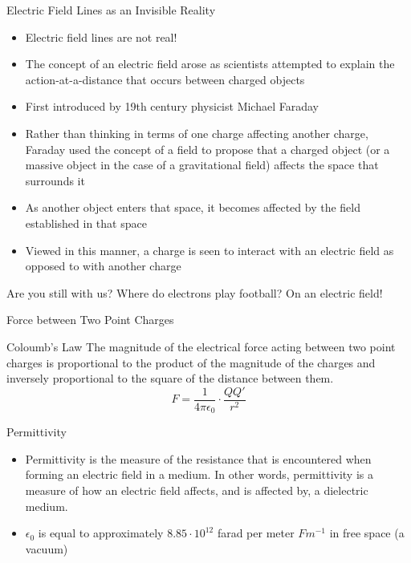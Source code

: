 \documentclass{beamer}
\begin{document}
	
\begin{frame}{Electric Field Lines as an Invisible Reality}{}
  \begin{itemize}
    \item Electric field lines are not real!
	\item The concept of an electric field arose as scientists attempted to explain the action-at-a-distance that occurs between charged objects
	\item First introduced by 19th century physicist Michael Faraday
	\item Rather than thinking in terms of one charge affecting another charge, Faraday used the concept of a field to propose that a charged object (or a massive object in the case of a gravitational field) affects the space that surrounds it
	\item  As another object enters that space, it becomes affected by the field established in that space
	\item Viewed in this manner, a charge is seen to interact with an electric field as opposed to with another charge
  \end{itemize}
\end{frame}

\begin{frame}{Are you still with us?}
Where do electrons play football? On an electric field!
\end{frame}

\begin{frame}{Force between Two Point Charges}
  \begin{block}{Coloumb's Law}
The magnitude of the electrical force acting between two point charges is proportional to the product of the magnitude of the charges and inversely proportional to the square of the distance between them.
\[F=\frac{1}{4\pi \epsilon_0} \cdot \frac{QQ\prime}{r^2} \]
  \end{block}
\end{frame}

\begin{frame}{Permittivity}{}
  \begin{itemize}
  \item Permittivity is the measure of the resistance that is encountered when forming an electric field in a medium. In other words, permittivity is a measure of how an electric field affects, and is affected by, a dielectric medium.
  \item \(\epsilon_0\) is equal to approximately \(8.85 \cdot 10^{12}\) farad per meter \(Fm^{-1}\) in free space (a vacuum)
  \end{itemize}
\end{frame}
\end{document}
